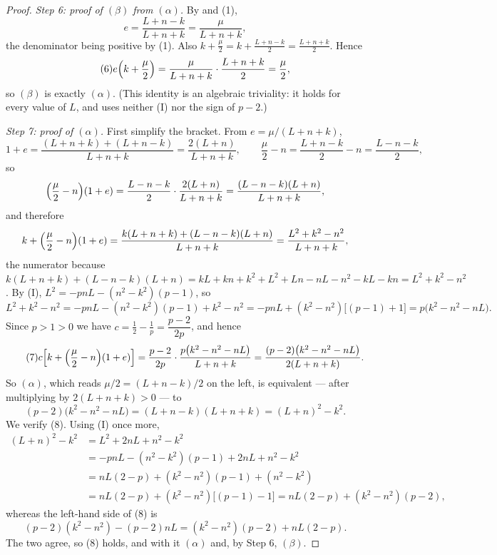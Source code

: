 \begin{proof}
\emph{Step 6: proof of $(\beta)$ from $(\alpha)$.}  By  and
(1),
\[
  e=\frac{L+n-k}{L+n+k}=\frac{\mu}{L+n+k},
\]
the denominator being positive by (1).  Also
$k+\frac{\mu}{2}=k+\frac{L+n-k}{2}=\frac{L+n+k}{2}$.  Hence
\begin{equation}\tag{6}
  e\Bigl(k+\frac{\mu}{2}\Bigr)
  =\frac{\mu}{L+n+k}\cdot\frac{L+n+k}{2}=\frac{\mu}{2},
\end{equation}
so $(\beta)$ is exactly $(\alpha)$.  (This identity is an algebraic triviality:
it holds for every value of $L$, and uses neither (I) nor the sign of $p-2$.)

\emph{Step 7: proof of $(\alpha)$.}  First simplify the bracket.  From
$e=\mu/(L+n+k)$,
\[
  1+e=\frac{(L+n+k)+(L+n-k)}{L+n+k}=\frac{2(L+n)}{L+n+k},
  \qquad
  \frac{\mu}{2}-n=\frac{L+n-k}{2}-n=\frac{L-n-k}{2},
\]
so
\[
  \Bigl(\frac{\mu}{2}-n\Bigr)(1+e)
  =\frac{L-n-k}{2}\cdot\frac{2(L+n)}{L+n+k}
  =\frac{(L-n-k)(L+n)}{L+n+k},
\]
and therefore
\[
  k+\Bigl(\frac{\mu}{2}-n\Bigr)(1+e)
  =\frac{k(L+n+k)+(L-n-k)(L+n)}{L+n+k}
  =\frac{L^2+k^2-n^2}{L+n+k},
\]
the numerator because
$k(L+n+k)+(L-n-k)(L+n)=kL+kn+k^2+L^2+Ln-nL-n^2-kL-kn=L^2+k^2-n^2$.
By (I), $L^2=-pnL-(n^2-k^2)(p-1)$, so
\[
  L^2+k^2-n^2=-pnL-(n^2-k^2)(p-1)+k^2-n^2
  =-pnL+(k^2-n^2)\bigl[(p-1)+1\bigr]=p\bigl(k^2-n^2-nL\bigr).
\]
Since $p>1>0$ we have $c=\tfrac12-\tfrac1p=\dfrac{p-2}{2p}$, and hence
\begin{equation}\tag{7}
  c\Bigl[k+\Bigl(\frac{\mu}{2}-n\Bigr)(1+e)\Bigr]
  =\frac{p-2}{2p}\cdot\frac{p\bigl(k^2-n^2-nL\bigr)}{L+n+k}
  =\frac{(p-2)\bigl(k^2-n^2-nL\bigr)}{2(L+n+k)} .
\end{equation}
So $(\alpha)$, which reads $\mu/2=(L+n-k)/2$ on the left, is equivalent --- after
multiplying by $2(L+n+k)>0$ --- to
\begin{equation}\tag{8}
  (p-2)\bigl(k^2-n^2-nL\bigr)=(L+n-k)(L+n+k)=(L+n)^2-k^2 .
\end{equation}
We verify (8).  Using (I) once more,
\begin{align*}
  (L+n)^2-k^2&=L^2+2nL+n^2-k^2\\
  &=-pnL-(n^2-k^2)(p-1)+2nL+n^2-k^2\\
  &=nL(2-p)+(k^2-n^2)(p-1)+(n^2-k^2)\\
  &=nL(2-p)+(k^2-n^2)\bigl[(p-1)-1\bigr]
  =nL(2-p)+(k^2-n^2)(p-2),
\end{align*}
whereas the left-hand side of (8) is
\[
  (p-2)(k^2-n^2)-(p-2)nL=(k^2-n^2)(p-2)+nL(2-p).
\]
The two agree, so (8) holds, and with it $(\alpha)$ and, by Step 6, $(\beta)$.


\end{proof}
